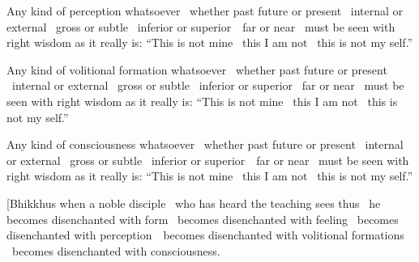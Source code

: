 \begin{english-only-hang}
Any kind of perception whatsoever \breathmark\ whether past future or present \breathmark\ internal or external \breathmark\ gross or subtle \breathmark\ inferior or \mbox{superior}~\breathmark\ far or near \breathmark\ must be seen with right wisdom as it really is: ``This is not mine \breathmark\ this I am not \breathmark\ this is not my self.''
\end{english-only-hang}

\begin{english-only-hang}
Any kind of volitional formation whatsoever \breathmark\ whether past future or present \breathmark\ internal or external \breathmark\ gross or subtle \breathmark\ inferior or superior \breathmark\ far or near \breathmark\ must be seen with right wisdom as it really is: ``This is not mine \breathmark\ this I am not \breathmark\ this is not my self.''
\end{english-only-hang}

\begin{english-only-hang}
Any kind of consciousness whatsoever \breathmark\ whether past future or present \breathmark\ internal or external \breathmark\ gross or subtle \breathmark\ inferior or \mbox{superior}~\breathmark\ far or near \breathmark\ must be seen with right wisdom as it really is: ``This is not mine \breathmark\ this I am not \breathmark\ this is not my self.''
\end{english-only-hang}

\begin{english-only-hang}
[Bhikkhus when a noble disciple\hyperlink{endnote109-appendix}{\hypertarget{endnote109-body}{}}
\breathmark\ who has heard the teaching\hyperlink{endnote110-appendix}{\hypertarget{endnote110-body}{}}
sees thus \breathmark\ he becomes disenchanted with form \breathmark\ becomes disenchanted with feeling \breathmark\ becomes disenchanted with \mbox{perception}~\breathmark\ becomes disenchanted with volitional formations \breathmark\ becomes disenchanted with consciousness.
\end{english-only-hang}

